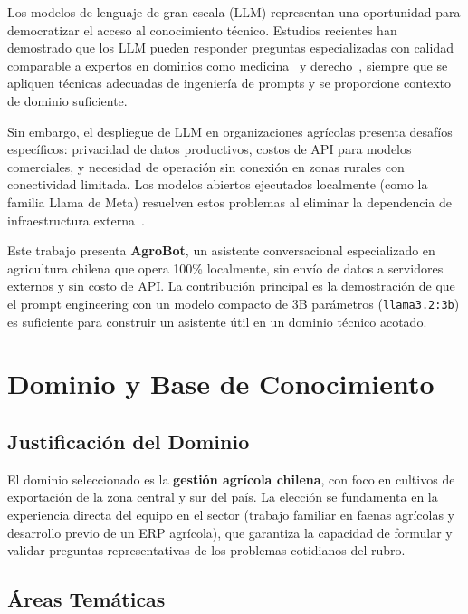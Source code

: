 \documentclass{IEEEtran}
\begin{document}
Los modelos de lenguaje de gran escala (LLM) representan una oportunidad
para democratizar el acceso al conocimiento técnico. Estudios recientes han
demostrado que los LLM pueden responder preguntas especializadas con calidad
comparable a expertos en dominios como medicina~\cite{singhal2023large} y
derecho~\cite{huang2023lawyer}, siempre que se apliquen técnicas adecuadas de
ingeniería de prompts y se proporcione contexto de dominio suficiente.

Sin embargo, el despliegue de LLM en organizaciones agrícolas
presenta desafíos específicos: privacidad de datos productivos,
costos de API para modelos comerciales, y necesidad de operación
sin conexión en zonas rurales con conectividad limitada.
Los modelos abiertos ejecutados localmente (como la familia Llama de Meta)
resuelven estos problemas al eliminar la dependencia de infraestructura
externa~\cite{touvron2023llama}.

Este trabajo presenta \textbf{AgroBot}, un asistente conversacional
especializado en agricultura chilena que opera 100\% localmente,
sin envío de datos a servidores externos y sin costo de API.
La contribución principal es la demostración de que el prompt engineering
con un modelo compacto de 3B parámetros (\texttt{llama3.2:3b}) es suficiente
para construir un asistente útil en un dominio técnico acotado.

\section{Dominio y Base de Conocimiento}

\subsection{Justificación del Dominio}

El dominio seleccionado es la \textbf{gestión agrícola chilena}, con foco en
cultivos de exportación de la zona central y sur del país.
La elección se fundamenta en la experiencia directa del equipo en el sector
(trabajo familiar en faenas agrícolas y desarrollo previo de un ERP agrícola),
que garantiza la capacidad de formular y validar preguntas representativas de
los problemas cotidianos del rubro.

\subsection{Áreas Temáticas}
\end{document}

